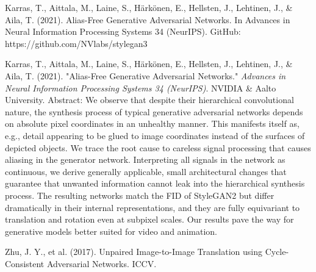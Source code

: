 \documentclass{article}
\begin{document}

\begin{thebibliography}{9}
 Karras, T., Aittala, M., Laine, S., Härkönen, E., Hellsten, J., Lehtinen, J., \& Aila, T. (2021). Alias-Free Generative Adversarial Networks. In Advances in Neural Information Processing Systems 34 (NeurIPS). GitHub: https://github.com/NVlabs/stylegan3

 Karras, T., Aittala, M., Laine, S., Härkönen, E., Hellsten, J., Lehtinen, J., \& Aila, T. (2021). 
"Alias-Free Generative Adversarial Networks."
\textit{Advances in Neural Information Processing Systems 34 (NeurIPS)}. 
NVIDIA \& Aalto University.
Abstract: We observe that despite their hierarchical convolutional nature, the synthesis process of typical generative adversarial networks depends on absolute pixel coordinates in an unhealthy manner. This manifests itself as, e.g., detail appearing to be glued to image coordinates instead of the surfaces of depicted objects. We trace the root cause to careless signal processing that causes aliasing in the generator network. Interpreting all signals in the network as continuous, we derive generally applicable, small architectural changes that guarantee that unwanted information cannot leak into the hierarchical synthesis process. The resulting networks match the FID of StyleGAN2 but differ dramatically in their internal representations, and they are fully equivariant to translation and rotation even at subpixel scales. Our results pave the way for generative models better suited for video and animation.

 Zhu, J. Y., et al. (2017). Unpaired Image-to-Image Translation using Cycle-Consistent Adversarial Networks. ICCV.
\end{thebibliography}
\end{document}
